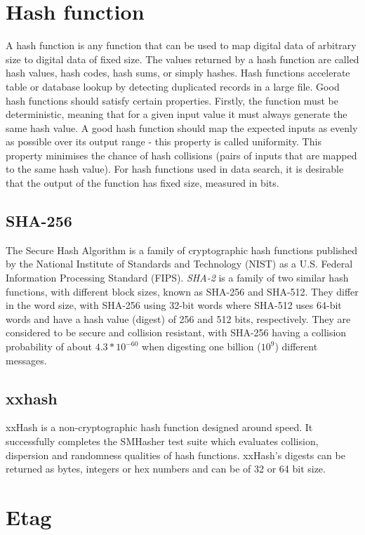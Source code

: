 \section{Hash function}
  A hash function is any function that can be used to map digital data of arbitrary size to digital data of fixed size. The values returned by a hash function are called hash values, hash codes, hash sums, or simply hashes. Hash functions accelerate table or database lookup by detecting duplicated records in a large file. Good hash functions should satisfy certain properties. Firstly, the function must be deterministic, meaning that for a given input value it must always generate the same hash value. A good hash function should map the expected inputs as evenly as possible over its output range - this property is called uniformity. This property minimises the chance of hash collisions (pairs of inputs that are mapped to the same hash value). For hash functions used in data search, it is desirable that the output of the function has fixed size, measured in bits.

  \subsection{SHA-256}
  The Secure Hash Algorithm is a family of cryptographic hash functions published by the National Institute of Standards and Technology (NIST) as a U.S. Federal Information Processing Standard (FIPS). \emph{SHA-2} is a family of two similar hash functions, with different block sizes, known as SHA-256 and SHA-512. They differ in the word size, with SHA-256 using 32-bit words where SHA-512 uses 64-bit words and have a hash value (digest) of 256 and 512 bits, respectively. They are considered to be secure and collision resistant, with SHA-256 having a collision probability of about $4.3*10^{-60}$ when digesting one billion ($10^9$) different messages.

  \subsection{xxhash}
  xxHash\cite{xxhash} is a non-cryptographic hash function designed around speed. It successfully completes the SMHasher test suite which evaluates collision, dispersion and randomness qualities of hash functions. xxHash's digests can be returned as bytes, integers or hex numbers and can be of 32 or 64 bit size.

\section{Etag}

